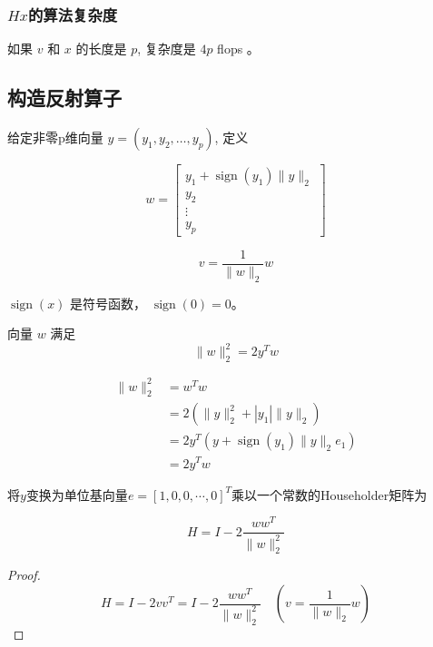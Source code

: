 \subsubsection{$Hx$的算法复杂度}

    如果 $ v $ 和 $ x $ 的长度是 $ p $, 复杂度是 $ 4 p $ flops 。


\subsection{构造反射算子}

给定非零p维向量 $ y=\left(y_{1}, y_{2}, \ldots, y_{p}\right) $, 定义

\begin{definition}
    $$w=\left[\begin{array}{c}
        y_{1}+\operatorname{sign}\left(y_{1}\right)\|y\|_{2} \\
        y_{2} \\
        \vdots \\
        y_{p}
        \end{array}\right]$$

    $$v=\frac{1}{\|w\|_{2}} w$$

    $\operatorname{sign}(x)$ 是符号函数， $\operatorname{sign}(0)=0$。
\end{definition}

\begin{theorem}
    向量 $ w $ 满足 $$ \|w\|_{2}^{2}=2 y^{T} w $$
\end{theorem}

$$
\begin{aligned}
    \|w\|_{2}^{2}&=w^{T} w\\
    &=2\left(\|y\|_{2}^{2}+\left|y_{1}\right|\|y\|_{2}\right)\\
    &=2 y^{T}\left(y+\operatorname{sign}\left(y_{1}\right)\|y\|_{2} e_{1}\right)\\
    &=2 y^{T} w 
\end{aligned}
$$

\begin{definition}
将$y$变换为单位基向量$e=[1,0,0,\cdots,0]^T$乘以一个常数的Householder矩阵为

    $$ H=I-2 \frac{w w^{T}}{\|w\|_{2}^{2}} $$
\end{definition}

\begin{proof}
    $$ H=I-2 v v^{T}=I-2 \frac{w w^{T}}{\|w\|_{2}^{2}} \quad(v=\frac{1}{\|w\|_{2}} w) $$
\end{proof}

